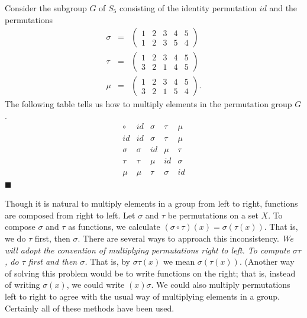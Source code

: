  
Consider the subgroup $G$ of $S_5$ consisting of the identity
permutation $id$ and the permutations 
\begin{eqnarray*}
\sigma
& = &
\left(
\begin{array}{ccccc}
1 & 2 & 3 & 4 & 5 \\
1 & 2 & 3 & 5 & 4
\end{array}
\right) \\
\tau
& = &
\left(
\begin{array}{ccccc}
1 & 2 & 3 & 4 & 5 \\
3 & 2 & 1 & 4 & 5
\end{array}
\right) \\
\mu
& = &
\left(
\begin{array}{ccccc}
1 & 2 & 3 & 4 & 5 \\
3 & 2 & 1 & 5 & 4
\end{array}
\right).
\end{eqnarray*}
The following table tells us how to multiply elements in the
permutation group $G$. 
$$
\begin{array}{c|cccc}
\circ  & id     & \sigma & \tau   & \mu    \\
\hline
id     & id     & \sigma & \tau   & \mu    \\
\sigma & \sigma & id     & \mu    & \tau   \\
\tau   & \tau   & \mu    & id     & \sigma \\
\mu    & \mu    & \tau   & \sigma & id
\end{array}
$$
\hspace{\fill} $\blacksquare$
 
 
\vspace{2ex}
 
 
Though it is natural to multiply elements in a group from left to
right, functions are composed from right to left.  Let $\sigma$ and
$\tau$ be permutations on a set $X$. To compose $\sigma$ and $\tau$ as
functions, we calculate $(\sigma \circ \tau)(x) = \sigma( \tau(x))$.
That is, we do $\tau$ first, then $\sigma$. There are several ways to
approach this inconsistency. {\em We will adopt the convention of
multiplying permutations right to left. To compute $\sigma \tau$, do
$\tau$ first and then $\sigma$.} That is, by $\sigma \tau (x)$ we mean
$\sigma( \tau( x))$. (Another way of solving this problem would be to
write functions on the right; that is, instead of writing $\sigma(x)$,
we could write $(x)\sigma$. We could also multiply permutations left
to right to agree with the usual way of multiplying elements in a
group. Certainly all of these methods have been used. 
 
